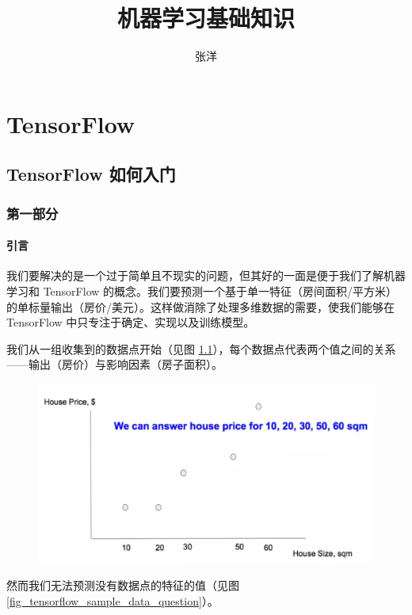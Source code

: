 \documentclass[11pt]{book} %
\title{机器学习基础知识}
\author{张洋}
\begin{document}
\maketitle
\tableofcontents

\part{TensorFlow}

\chapter{TensorFlow 如何入门}

\section{第一部分}

\subsection{引言}

我们要解决的是一个过于简单且不现实的问题，但其好的一面是便于我们了解机器学习和 TensorFlow 的概念。我们要预测一个基于单一特征（房间面积/平方米）的单标量输出（房价/美元）。这样做消除了处理多维数据的需要，使我们能够在 TensorFlow 中只专注于确定、实现以及训练模型。

我们从一组收集到的数据点开始（见图 \ref{fig_tensorflow_sample_data}），每个数据点代表两个值之间的关系——输出（房价）与影响因素（房子面积）。

\begin{figure}
\centering
\includegraphics[width=\linewidth]{figures/tensorflow_sample_data}
\caption{}
\label{fig_tensorflow_sample_data}
\end{figure}

然而我们无法预测没有数据点的特征的值（见图 \ref{fig_tensorflow_sample_data_question}）。
\end{document}
